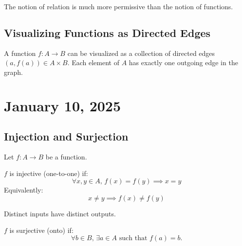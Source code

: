 \documentclass[11pt]{article}
\begin{document}
\begin{fact}
    The notion of relation is much more permissive than the notion of functions.
\end{fact}

\subsection{Visualizing Functions as Directed Edges}
A function $f: A \to B$ can be visualized as a collection of directed edges
$(a, f(a)) \in A \times B$. Each element of $A$ has exactly one outgoing edge
in the graph.

\begin{center}
\end{center}
\section{January 10, 2025}
\subsection{Injection and Surjection}

Let $f : A \to B$ be a function.

\begin{definition}

    $f$ is injective (one-to-one) if:
    \[
        \forall x, y \in A, \, f(x) = f(y) \implies x = y
    \]
    Equivalently:
    \[
        x \neq y \implies f(x) \neq f(y)
    \]\end{definition}

\begin{fact} Distinct inputs have distinct outputs.
\end{fact}

\begin{definition}

    $f$ is surjective (onto) if:
    \[
        \forall b \in B, \, \exists a \in A \text{ such that } f(a) = b.
    \]

\end{definition}
\end{document}
